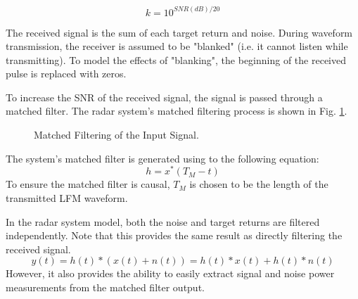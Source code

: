 \documentclass[conference]{IEEEtran}
\begin{document}
\begin{equation}
k = 10^{SNR(dB)/20}
\end{equation}
\par
The received signal is the sum of each target return and noise. During waveform transmission, the receiver is assumed to be "blanked" (i.e. it cannot listen while transmitting). To model the effects of "blanking", the beginning of the received pulse is replaced with zeros.
\par
To increase the SNR of the received signal, the signal is passed through a matched filter. The radar system's matched filtering process is shown in Fig. \ref{gen_mf_output}. 
\begin{figure}[H]
\centerline{}
\caption{Matched Filtering of the Input Signal.}
\label{gen_mf_output}
\end{figure}
\par
The system's matched filter is generated using to the following equation:
\begin{equation}
h = x^*(T_M-t)
\end{equation}
To ensure the matched filter is causal, $T_M$ is chosen to be the length of the transmitted LFM waveform.
\par
In the radar system model, both the noise and target returns are filtered independently. Note that this provides the same result as directly filtering the received signal.
\begin{equation}
y(t) = h(t)*(x(t)+n(t)) = h(t)*x(t) + h(t)*n(t)
\end{equation}
However, it also provides the ability to easily extract signal and noise power measurements from the matched filter output.
\end{document}
